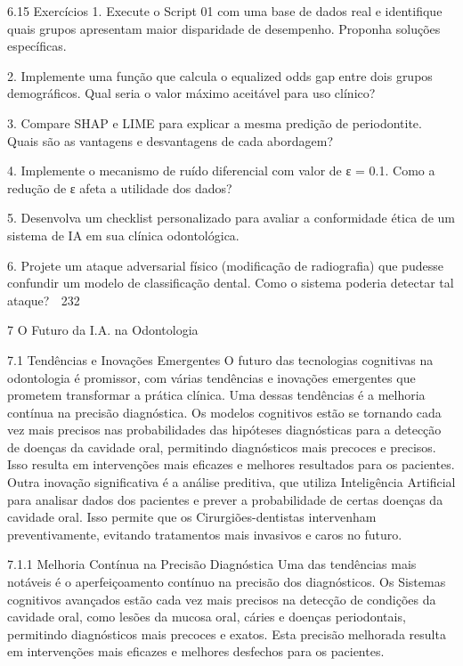 6.15       Exercícios
  1. Execute o Script 01 com uma base de dados real e identifique quais grupos
     apresentam maior disparidade de desempenho. Proponha soluções específicas.

  2. Implemente uma função que calcula o equalized odds gap entre dois grupos
     demográficos. Qual seria o valor máximo aceitável para uso clínico?

  3. Compare SHAP e LIME para explicar a mesma predição de periodontite. Quais
     são as vantagens e desvantagens de cada abordagem?

  4. Implemente o mecanismo de ruído diferencial com valor de ε = 0.1. Como a
     redução de ε afeta a utilidade dos dados?

  5. Desenvolva um checklist personalizado para avaliar a conformidade ética de um
     sistema de IA em sua clínica odontológica.

  6. Projete um ataque adversarial físico (modificação de radiografia) que pudesse
     confundir um modelo de classificação dental. Como o sistema poderia detectar
     tal ataque?
                                                                                           232



7 O Futuro da I.A. na Odontologia

7.1     Tendências e Inovações Emergentes
O futuro das tecnologias cognitivas na odontologia é promissor, com várias tendências
e inovações emergentes que prometem transformar a prática clínica. Uma dessas
tendências é a melhoria contínua na precisão diagnóstica. Os modelos cognitivos estão
se tornando cada vez mais precisos nas probabilidades das hipóteses diagnósticas
para a detecção de doenças da cavidade oral, permitindo diagnósticos mais precoces
e precisos. Isso resulta em intervenções mais eficazes e melhores resultados para os
pacientes.
        Outra inovação significativa é a análise preditiva, que utiliza Inteligência Artificial
para analisar dados dos pacientes e prever a probabilidade de certas doenças da
cavidade oral. Isso permite que os Cirurgiões-dentistas intervenham preventivamente,
evitando tratamentos mais invasivos e caros no futuro.

7.1.1    Melhoria Contínua na Precisão Diagnóstica
Uma das tendências mais notáveis é o aperfeiçoamento contínuo na precisão dos
diagnósticos. Os Sistemas cognitivos avançados estão cada vez mais precisos na
detecção de condições da cavidade oral, como lesões da mucosa oral, cáries e doenças
periodontais, permitindo diagnósticos mais precoces e exatos. Esta precisão melhorada
resulta em intervenções mais eficazes e melhores desfechos para os pacientes.

